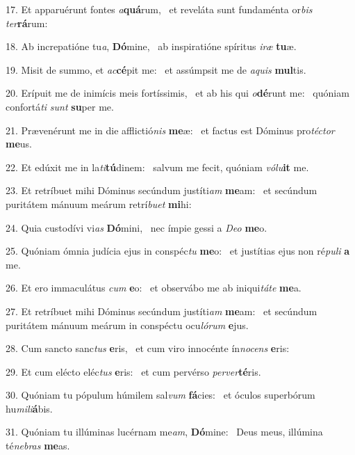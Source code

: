 17. Et apparuérunt fontes \textit{a}\textbf{quá}rum, \ast\  et reveláta sunt fundaménta or\textit{bis} \textit{ter}\textbf{rá}rum:\

18. Ab increpatióne tu\textit{a}, \textbf{Dó}mine, \ast\  ab inspiratióne spíritus \textit{i}\textit{ræ} \textbf{tu}æ.\

19. Misit de summo, et \textit{ac}\textbf{cé}pit me: \ast\  et assúmpsit me de \textit{a}\textit{quis} \textbf{mul}tis.\

20. Erípuit me de inimícis meis fortíssimis, \dag\  et ab his qui \textit{o}\textbf{dé}runt me: \ast\  quóniam confortá\textit{ti} \textit{sunt} \textbf{su}per me.\

21. Prævenérunt me in die afflictió\textit{nis} \textbf{me}æ: \ast\  et factus est Dóminus pro\textit{téc}\textit{tor} \textbf{me}us.\

22. Et edúxit me in la\textit{ti}\textbf{tú}dinem: \ast\  salvum me fecit, quóniam \textit{vó}\textit{lu}\textbf{it} me.\

23. Et retríbuet mihi Dóminus secúndum justíti\textit{am} \textbf{me}am: \ast\  et secúndum puritátem mánuum meárum retrí\textit{bu}\textit{et} \textbf{mi}hi:\

24. Quia custodívi vi\textit{as} \textbf{Dó}mini, \ast\  nec ímpie gessi a \textit{De}\textit{o} \textbf{me}o.\

25. Quóniam ómnia judícia ejus in conspéc\textit{tu} \textbf{me}o: \ast\  et justítias ejus non ré\textit{pu}\textit{li} \textbf{a} me.\

26. Et ero immaculátus \textit{cum} \textbf{e}o: \ast\  et observábo me ab iniqui\textit{tá}\textit{te} \textbf{me}a.\

27. Et retríbuet mihi Dóminus secúndum justíti\textit{am} \textbf{me}am: \ast\  et secúndum puritátem mánuum meárum in conspéctu ocu\textit{ló}\textit{rum} \textbf{e}jus.\

28. Cum sancto sanc\textit{tus} \textbf{e}ris, \ast\  et cum viro innocénte ín\textit{no}\textit{cens} \textbf{e}ris:\

29. Et cum elécto eléc\textit{tus} \textbf{e}ris: \ast\  et cum pervérso \textit{per}\textit{ver}\textbf{té}ris.\

30. Quóniam tu pópulum húmilem sal\textit{vum} \textbf{fá}cies: \ast\  et óculos superbórum hu\textit{mi}\textit{li}\textbf{á}bis.\

31. Quóniam tu illúminas lucérnam me\textit{am}, \textbf{Dó}mine: \ast\  Deus meus, illúmina té\textit{ne}\textit{bras} \textbf{me}as.\

